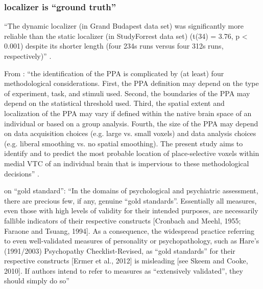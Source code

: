 \subsubsection{localizer is ``ground truth''}

%
``The dynamic localizer (in Grand Budapest data set) was significantly more
reliable than the static localizer (in StudyForrest data set) (t(34) = 3.76, p <
0.001) despite its shorter length (four 234s runs versus four 312s runs,
respectively)'' \citep{jiahui2020predicting}.

%
From \citep{weiner2018defining}: ``the identification of the PPA is complicated
by (at least) four methodological considerations. First, the PPA definition may
depend on the type of experiment, task, and stimuli used. Second, the boundaries
of the PPA may depend on the statistical threshold used. Third, the spatial
extent and localization of the PPA may vary if defined within the native brain
space of an individual or based on a group analysis. Fourth, the size of the PPA
may depend on data acquisition choices (e.g. large vs. small voxels) and data
analysis choices (e.g. liberal smoothing vs. no spatial smoothing). The present
study aims to identify and to predict the most probable location of
place-selective voxels within medial VTC of an individual brain that is
impervious to these methodological decisions'' \citep{weiner2018defining}.

%
\citet{lilienfeld2015fifty} on ``gold standard'': ``In the domains of
psychological and psychiatric assessment, there are precious few, if any,
genuine ``gold standards''. Essentially all measures, even those with high
levels of validity for their intended purposes, are necessarily fallible
indicators of their respective constructs [Cronbach and Meehl, 1955; Faraone and
Tsuang, 1994]. As a consequence, the widespread practice referring to even
well-validated measures of personality or psychopathology, such as Hare’s
(1991/2003) Psychopathy Checklist-Revised, as ``gold standards'' for their
respective constructs [Ermer et al., 2012] is misleading [see Skeem and Cooke,
2010]. If authors intend to refer to measures as ``extensively validated'', they
should simply do so'' \citep{lilienfeld2015fifty}

